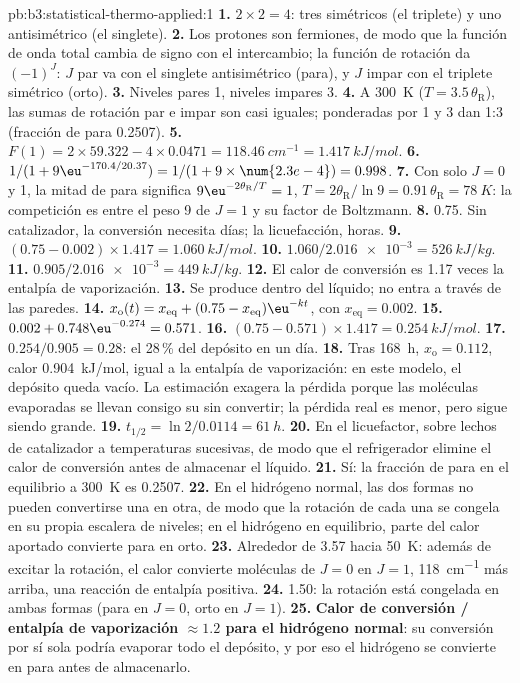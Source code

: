 \begin{solution}{pb:b3:statistical-thermo-applied:1}
\textbf{1.} $2 \times 2 = 4$: tres simétricos (el triplete) y uno antisimétrico (el singlete).
\textbf{2.} Los protones son fermiones, de modo que la función de onda total cambia de signo con el
intercambio; la función de rotación da $(-1)^J$: $J$ par va con el singlete
antisimétrico (para), y $J$ impar con el triplete simétrico (orto).
\textbf{3.} Niveles pares 1, niveles impares 3.
\textbf{4.} A \qty{300}{K} ($T = 3.5\,\theta_{\mathrm R}$), las sumas de rotación par e impar son casi iguales;
ponderadas por 1 y 3 dan 1:3 (fracción de para 0.2507).
\textbf{5.} $F(1) = 2 \times 59.322 - 4 \times 0.0471 = \qty{118.46}{cm^{-1}} = \qty{1.417}{kJ/mol}$.
\textbf{6.} $1/(1 + 9\eu^{-170.4/20.37}) = 1/(1 + 9 \times \num{2.3e-4}) = 0.998$.
\textbf{7.} Con solo $J = 0$ y 1, la mitad de para significa $9\eu^{-2\theta_{\mathrm R}/T} = 1$, $T = 2\theta_{\mathrm R}/\ln9 =
0.91\,\theta_{\mathrm R} = \qty{78}{K}$: la competición es entre el peso 9 de $J = 1$ y su
factor de Boltzmann.
\textbf{8.} 0.75. Sin catalizador, la conversión necesita días; la licuefacción,
horas.
\textbf{9.} $(0.75 - 0.002) \times 1.417 = \qty{1.060}{kJ/mol}$.
\textbf{10.} $1.060/\num{2.016e-3} = \qty{526}{kJ/kg}$.
\textbf{11.} $0.905/\num{2.016e-3} = \qty{449}{kJ/kg}$.
\textbf{12.} El calor de conversión es 1.17 veces la entalpía de vaporización.
\textbf{13.} Se produce dentro del líquido; no entra a través de las paredes.
\textbf{14.} $x_{\mathrm o}(t) = x_{\mathrm{eq}} + (0.75 - x_{\mathrm{eq}})\eu^{-kt}$, con $x_{\mathrm{eq}} = 0.002$.
\textbf{15.} $0.002 + 0.748\eu^{-0.274} = 0.571$.
\textbf{16.} $(0.75 - 0.571) \times 1.417 = \qty{0.254}{kJ/mol}$.
\textbf{17.} $0.254/0.905 = 0.28$: el 28\,\% del depósito en un día.
\textbf{18.} Tras \qty{168}{h}, $x_{\mathrm o} = 0.112$, calor \qty{0.904}{kJ/mol}, igual a la entalpía de
vaporización: en este modelo, el depósito queda vacío. La estimación exagera la
pérdida porque las moléculas evaporadas se llevan consigo su  sin
convertir; la pérdida real es menor, pero sigue siendo grande.
\textbf{19.} $t_{1/2} = \ln2/0.0114 = \qty{61}{h}$.
\textbf{20.} En el licuefactor, sobre lechos de catalizador a temperaturas sucesivas, de modo que el
refrigerador elimine el calor de conversión antes de almacenar el líquido.
\textbf{21.} Sí: la fracción de para en el equilibrio a \qty{300}{K} es 0.2507.
\textbf{22.} En el hidrógeno normal, las dos formas no pueden convertirse una en otra, de modo que la
rotación de cada una se congela en su propia escalera de niveles; en el hidrógeno en equilibrio, parte
del calor aportado convierte para en orto.
\textbf{23.} Alrededor de 3.57 hacia \qty{50}{K}: además de excitar la rotación, el calor convierte
moléculas de $J = 0$ en $J = 1$, \qty{118}{cm^{-1}} más arriba, una reacción de entalpía
positiva.
\textbf{24.} 1.50: la rotación está congelada en ambas formas (para en $J = 0$, orto en $J = 1$).
\textbf{25.} \textbf{Calor de conversión / entalpía de vaporización $\approx 1.2$ para el hidrógeno
normal}: su conversión por sí sola podría evaporar todo el depósito, y por eso el
hidrógeno se convierte en para antes de almacenarlo.
\end{solution}
